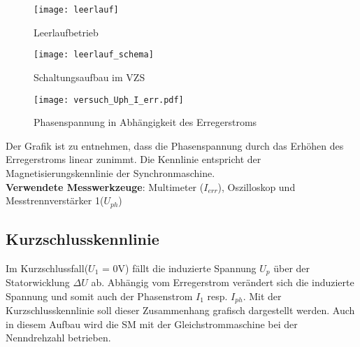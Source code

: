 \begin{flushleft}
\begin{figure}[H]
    \centering
        \texttt{[image: leerlauf]}
         \caption[]{Leerlaufbetrieb \footnotemark}
    \label{fig:abb1}
\end{figure}





\begin{figure}[H]
    \centering
        \texttt{[image: leerlauf\_schema]}
    \caption{Schaltungsaufbau im VZS}
    \label{fig:abb1}
\end{figure}









\newpage



\begin{figure}[H]
    \centering
        \texttt{[image: versuch\_Uph\_I\_err.pdf]}
    \caption{Phasenspannung in Abhängigkeit des Erregerstroms}
    \label{fig:Leerlauf}
\end{figure}



Der Grafik ist zu entnehmen, dass die Phasenspannung durch das Erhöhen des Erregerstroms linear zunimmt. 
Die Kennlinie entspricht der Magnetisierungskennlinie der Synchronmaschine.\\


\vspace{0.4cm}
\textbf{Verwendete Messwerkzeuge}: Multimeter ($I_{err}$), Oszilloskop und\\ Messtrennverstärker 1($U_{ph}$)

\newpage






\subsection{Kurzschlusskennlinie}

Im Kurzschlussfall($U_1$ = 0V) fällt die induzierte Spannung $U_p$ über der Statorwicklung $\Delta U$ ab. Abhängig vom Erregerstrom verändert sich die induzierte Spannung und somit auch der Phasenstrom $I_1$ resp. $I_{ph}$.
Mit der Kurzschlusskennlinie soll dieser Zusammenhang grafisch dargestellt werden.
Auch in diesem Aufbau wird die SM mit der Gleichstrommaschine bei der Nenndrehzahl   betrieben.\\


\end{flushleft}

